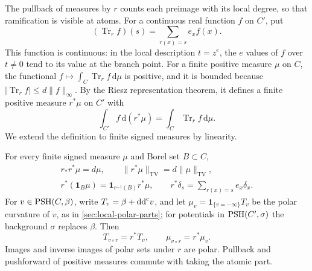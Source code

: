 The pullback of measures by $r$ counts each preimage with its
local degree, so that ramification is visible at atoms.
For a continuous real function $f$ on $C'$, put
\[
 (\operatorname{Tr}_r f)(s)
       =\sum_{r(x)=s}e_xf(x).
\]
This function is continuous: in the local description $t=z^e$,
the $e$ values of $f$ over $t\ne0$ tend to its value at the
branch point. For a finite positive measure $\mu$ on $C$, the
functional $f\mapsto\int_C\operatorname{Tr}_r f\,\mathrm d\mu$ is
positive, and it is bounded because
$|\operatorname{Tr}_r f|\leq d\|f\|_\infty$. By the Riesz
representation theorem, it defines a finite positive measure
$r^*\mu$ on $C'$ with
\[
 \int_{C'}f\,\mathrm d(r^*\mu)
       =\int_C\operatorname{Tr}_r f\,\mathrm d\mu.
\]
We extend the definition to finite signed measures by linearity.

\begin{lemma}\label{finite-curve:measure-pullback}
For every finite signed measure $\mu$ and Borel set $B\subset C$,
\[
 \begin{gathered}
 r_*r^*\mu=d\mu,\qquad
 \|r^*\mu\|_{\mathrm{TV}}=d\|\mu\|_{\mathrm{TV}},\\
 r^*(\mathbf1_B\mu)=\mathbf1_{r^{-1}(B)}r^*\mu,
 \qquad r^*\delta_s=\sum_{r(x)=s}e_x\delta_x.
 \end{gathered}
\]
For $v\in\mathrm{PSH}(C,\beta)$, write
$T_v=\beta+\mathrm{dd}^{\mathrm{c}} v$, and let
$\mu_v=\mathbf1_{\{v=-\infty\}}T_v$ be the polar curvature of
$v$, as in \cref{sec:local-polar-parts}; for potentials in
$\mathrm{PSH}(C',\sigma)$ the background $\sigma$ replaces $\beta$. Then
\[
 T_{v\circ r}=r^*T_v,\qquad
 \mu_{v\circ r}=r^*\mu_v.
\]
Images and inverse images of polar sets under $r$ are polar.
Pullback and pushforward of positive measures commute with
taking the atomic part.
\end{lemma}
